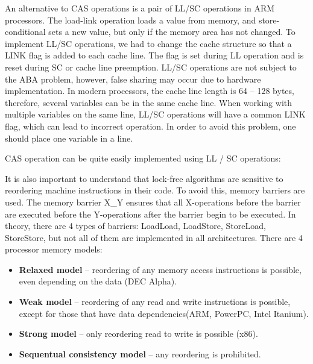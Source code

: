 {\begin{figure}[H]
		\label{CAS:image}
	\end{figure}
	\par An alternative to CAS operations is a pair of LL/SC operations in ARM processors. The load-link operation loads a value from memory, and store-conditional sets a new value, but only if the memory area has not changed. To implement LL/SC operations, we had to change the cache structure so that a LINK flag is added to each cache line. The flag is set during LL operation and is reset during SC or cache line preemption. LL/SC operations are not subject to the ABA problem, however, false sharing may occur due to hardware implementation. In modern processors, the cache line length is 64 – 128 bytes, therefore, several variables can be in the same cache line. When working with multiple variables on the same line, LL/SC operations will have a common LINK flag, which can lead to incorrect operation. In order to avoid this problem, one should place one variable in a line.
	\begin{figure}[H]
		
	\end{figure}
	\par CAS operation can be quite easily implemented using LL / SC operations:
	\begin{figure}[H]
		
	\end{figure}
	\par It is also important to understand that lock-free algorithms are sensitive to reordering machine instructions in their code. To avoid this, memory barriers are used. The memory barrier X\_Y ensures that all X-operations before the barrier are executed before the Y-operations after the barrier begin to be executed. In theory, there are 4 types of barriers: LoadLoad, LoadStore, StoreLoad, StoreStore, but not all of them are implemented in all architectures. There are 4 processor memory models:
	\begin{itemize}  
		\item\textbf{Relaxed model} -- reordering of any memory access instructions is possible, even depending on the data (DEC Alpha).
		\item\textbf{Weak model} -- reordering of any read and write instructions is possible, except for those that have data dependencies(ARM, PowerPC, Intel Itanium).
		\item\textbf{Strong model } -- only reordering read to write is possible (x86).
		\item\textbf{Sequentual consistency model} -- any reordering is prohibited.

\end{itemize}}
